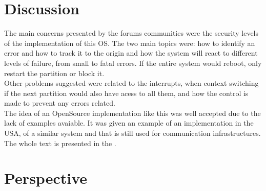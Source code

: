 \section{Discussion}
The main concerns presented by the forums communities were the security levels of the implementation of
this OS. The two main topics were: how to identify an error and how to track it to the origin and how the
system will react to different levels of failure, from small to fatal errors. If the entire system would
reboot, only restart the partition or block it.\\
Other problems suggested were related to the interrupts, when context switching if the next partition
would also have acess to all them, and how the control is made to prevent any errors related.\\
The idea of an OpenSource implementation like this was well accepted due to the lack of examples avaiable.
It was given an example of an implementation in the USA, of a similar system and that is still used for
communication infrastructures.
The whole text is presented in the .

\section{Perspective}
